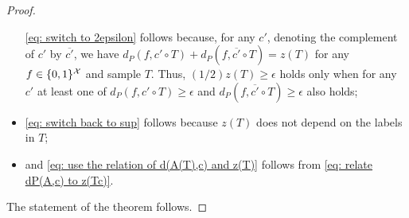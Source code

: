 \begin{proof}
\begin{itemize}
\eqref{eq: switch to 2epsilon} follows
because, for any $c'$, denoting the complement of $c'$ by $\overline{c'}$, we have
\(
  d_P\left(f,c'\circ{T} \right) 
  +
  d_P\left(f,\overline{c'}\circ{T} \right)
  =
  z\left({T}\right)
\)
for any $f \in \{0,1\}^{\mathcal{X}}$ and sample $T$. Thus, $(1/2)z(T) \geq \epsilon$ holds only when for any $c'$ at least one of $d_P\left(f,c'\circ{T} \right) \geq \epsilon$ and $d_P\left(f,\overline{c'}\circ{T} \right) \geq \epsilon$ also holds;
\item
\eqref{eq: switch back to sup} follows because $z(T)$ does not depend on the labels in $T$;
\item
and \eqref{eq: use the relation of d(A(T),c) and z(T)} follows from \eqref{eq: relate dP(A,c) to z(Tc)}.
\end{itemize}
The statement of the theorem follows.
\end{proof}
